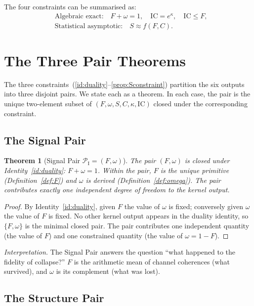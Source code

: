 \documentclass[
  aps,
  prd,
  twocolumn,
  superscriptaddress,
  nofootinbib,
  floatfix
]{revtex4-2}
\newtheorem{theorem}{Theorem}
\newcommand{\IC}{\mathrm{IC}}
\begin{document}
The four constraints can be summarised as:
\begin{align}
  &\text{Algebraic exact:}\quad F+\omega=1,\quad \IC=e^{\kappa},\quad \IC\le F,\\
  &\text{Statistical asymptotic:}\quad S\approx f(F,C).
\end{align}

\section{The Three Pair Theorems}\label{sec:pairs}

The three constraints~(\ref{id:duality}--\ref{prop:Sconstraint})
partition the six outputs into three disjoint pairs.  We state
each as a theorem.  In each case, the pair is the unique
two-element subset of $(F,\omega,S,C,\kappa,\IC)$ closed under
the corresponding constraint.

\subsection{The Signal Pair}

\begin{theorem}[Signal Pair $\mathcal{P}_{\mathrm{I}}=(F,\omega)$]\label{thm:signal}
The pair $(F,\omega)$ is closed under
Identity~\ref{id:duality}: $F+\omega=1$.  Within the pair, $F$
is the unique primitive (Definition~\ref{def:F}) and $\omega$ is
derived (Definition~\ref{def:omega}).  The pair contributes
exactly one independent degree of freedom to the kernel output.
\end{theorem}

\begin{proof}
By Identity~\ref{id:duality}, given $F$ the value of $\omega$ is
fixed; conversely given $\omega$ the value of $F$ is fixed.  No
other kernel output appears in the duality identity, so
$\{F,\omega\}$ is the minimal closed pair.  The pair contributes
one independent quantity (the value of $F$) and one constrained
quantity (the value of $\omega=1-F$).
\end{proof}

\emph{Interpretation.}  The Signal Pair answers the question
``what happened to the fidelity of collapse?''  $F$ is the
arithmetic mean of channel coherences (what survived), and
$\omega$ is its complement (what was lost).

\subsection{The Structure Pair}
\end{document}
